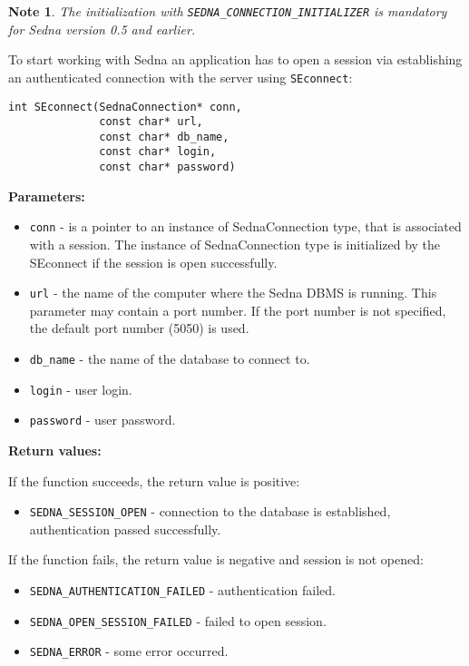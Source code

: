 \documentclass[a4paper,12pt]{article}
\newtheorem{note}{Note}    %
\newenvironment{citemize}
{\begin{itemize}
  \setlength{\itemsep}{0pt}
  \setlength{\parskip}{0pt}
  \setlength{\parsep}{0pt}}
{\end{itemize}}
\begin{document}
\begin{note}
The initialization with \verb!SEDNA_CONNECTION_INITIALIZER! is mandatory for
Sedna version 0.5 and earlier.
\end{note}

To start working with Sedna an application has to open a session via
establishing an authenticated connection with the server using \verb!SEconnect!:

\begin{verbatim}
int SEconnect(SednaConnection* conn,
              const char* url,
              const char* db_name,
              const char* login,
              const char* password)
\end{verbatim}

\noindent
\textbf{Parameters:}

\begin{citemize}
\item\verb!conn! - is a pointer to an instance of SednaConnection type, that is
associated with a session. The instance of SednaConnection type is initialized
by the SEconnect if the session is open successfully.
\item\verb!url! - the name of the computer where the Sedna DBMS is running. This
parameter may contain a port number. If the port number is not specified, the
default port number (5050) is used.
\item\verb!db_name! - the name of the database to connect to.
\item\verb!login! - user login.
\item\verb!password! - user password.
\end{citemize}

\noindent
\textbf{Return values:}

\medskip

\noindent
If the function succeeds, the return value is positive:

\begin{citemize}
\item\verb!SEDNA_SESSION_OPEN! - connection to the database is established,
authentication passed successfully.
\end{citemize}

\noindent
If the function fails, the return value is negative and session is not opened:

\begin{citemize}
\item\verb!SEDNA_AUTHENTICATION_FAILED! - authentication failed.
\item\verb!SEDNA_OPEN_SESSION_FAILED! - failed to open session.
\item\verb!SEDNA_ERROR! - some error occurred.
\end{citemize}
\end{document}
